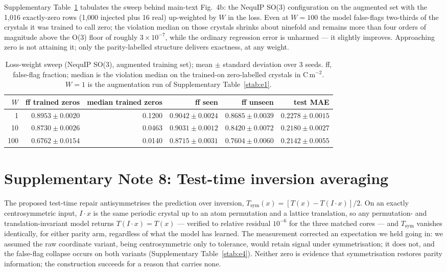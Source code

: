 Supplementary Table~\ref{stab:h3} tabulates the sweep behind main-text Fig.~4b: the NequIP SO(3) configuration on the augmented set with the 1,016 exactly-zero rows (1,000 injected plus 16 real) up-weighted by $W$ in the loss. Even at $W = 100$ the model false-flags two-thirds of the crystals it was trained to call zero; the violation median on those crystals shrinks about ninefold and remains more than four orders of magnitude above the O(3) floor of roughly $3\times10^{-7}$, while the ordinary regression error is unharmed --- it slightly improves. Approaching zero is not attaining it; only the parity-labelled structure delivers exactness, at any weight.

\begin{table}[htbp]
\centering
\small
\caption{Loss-weight sweep (NequIP SO(3), augmented training set); mean $\pm$ standard deviation over 3 seeds. ff, false-flag fraction; median is the violation median on the trained-on zero-labelled crystals in C\,m$^{-2}$. $W = 1$ is the augmentation run of Supplementary Table~\ref{stab:e1}.}
\label{stab:h3}
\begin{tabular}{rrrrrr}
\toprule
$W$ & ff trained zeros & median trained zeros & ff seen & ff unseen & test MAE \\
\midrule
1 & $0.8953 \pm 0.0020$ & 0.1200 & $0.9042 \pm 0.0024$ & $0.8685 \pm 0.0039$ & $0.2278 \pm 0.0015$ \\
10 & $0.8730 \pm 0.0026$ & 0.0463 & $0.9031 \pm 0.0012$ & $0.8420 \pm 0.0072$ & $0.2180 \pm 0.0027$ \\
100 & $0.6762 \pm 0.0154$ & 0.0140 & $0.8715 \pm 0.0031$ & $0.7604 \pm 0.0060$ & $0.2142 \pm 0.0055$ \\
\bottomrule
\end{tabular}
\end{table}

\section*{Supplementary Note 8: Test-time inversion averaging}

The proposed test-time repair antisymmetrises the prediction over inversion, $T_{\mathrm{sym}}(x) = [T(x) - T(I\!\cdot\!x)]/2$. On an exactly centrosymmetric input, $I\!\cdot\!x$ is the same periodic crystal up to an atom permutation and a lattice translation, so any permutation- and translation-invariant model returns $T(I\!\cdot\!x) = T(x)$ --- verified to relative residual $10^{-6}$ for the three matched cores --- and $T_{\mathrm{sym}}$ vanishes identically, for either parity arm, regardless of what the model has learned. The measurement corrected an expectation we held going in: we assumed the raw coordinate variant, being centrosymmetric only to tolerance, would retain signal under symmetrisation; it does not, and the false-flag collapse occurs on both variants (Supplementary Table~\ref{stab:e4}). Neither zero is evidence that symmetrisation restores parity information; the construction succeeds for a reason that carries none.

